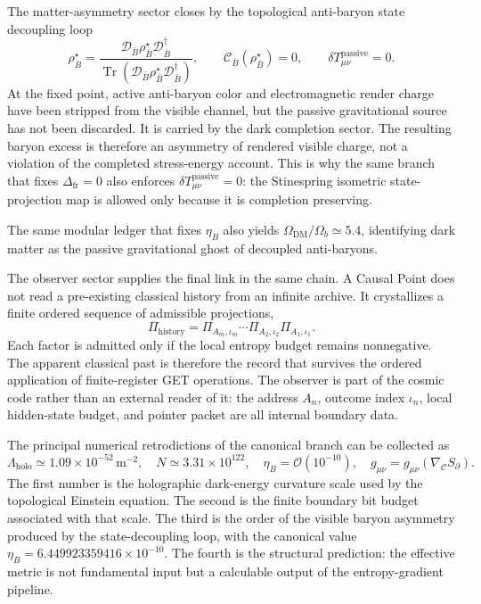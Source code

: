 \documentclass[11pt,letterpaper]{article}
\theoremstyle{plain}
\DeclareMathOperator{\Tr}{Tr}
\newcommand{\Deltafr}{\Delta_{\text{fr}}}
\newcommand{\Lholo}{\Lambda_{\text{holo}}}
\newcommand{\Nbits}{N}
\begin{document}
The matter-asymmetry sector closes by the topological anti-baryon state decoupling loop
\begin{equation}
\label{eq:section-nine-baryogenesis-fixed-point}
 \boxed{
 \rho_{\bar B}^{\star}
 =
 \frac{
 \mathcal D_{\bar B}\rho_{\bar B}^{\star}\mathcal D_{\bar B}^{\dagger}}
 {\Tr\!\left(
 \mathcal D_{\bar B}\rho_{\bar B}^{\star}\mathcal D_{\bar B}^{\dagger}
 \right)},
 \qquad
 \mathcal C_{\bar B}(\rho_{\bar B}^{\star})=0,
 \qquad
 \delta T_{\mu\nu}^{\text{passive}}=0.
 }
\end{equation}
At the fixed point, active anti-baryon color and electromagnetic render charge
have been stripped from the visible channel, but the passive gravitational
source has not been discarded.  It is carried by the dark completion sector.
The resulting baryon excess is therefore an asymmetry of rendered visible
charge, not a violation of the completed stress-energy account.  This is why
the same branch that fixes $\Deltafr=0$ also enforces
\(\delta T_{\mu\nu}^{\text{passive}}=0\): the Stinespring isometric
state-projection map is allowed only because it is completion preserving.

The same modular ledger that fixes \(\eta_B\) also yields
\(\Omega_{\text{DM}}/\Omega_b\simeq5.4\), identifying dark matter as the passive
gravitational ghost of decoupled anti-baryons.

The observer sector supplies the final link in the same chain.  A Causal Point
does not read a pre-existing classical history from an infinite archive.  It
crystallizes a finite ordered sequence of admissible projections,
\begin{equation}
\label{eq:section-nine-history-crystallization}
 \boxed{
 \Pi_{\text{history}}
 =
 \Pi_{A_m,\iota_m}\cdots\Pi_{A_2,\iota_2}\Pi_{A_1,\iota_1}.
 }
\end{equation}
Each factor is admitted only if the local entropy budget remains nonnegative.
The apparent classical past is therefore the record that survives the ordered
application of finite-register GET operations.  The observer is part of the
cosmic code rather than an external reader of it: the address $A_n$, outcome
index $\iota_n$, local hidden-state budget, and pointer packet are all internal
boundary data.

The principal numerical retrodictions of the canonical branch can be collected
as
\begin{equation}
\label{eq:section-nine-prediction-summary}
 \boxed{
 \Lholo\simeq1.09\times10^{-52}\,\mathrm{m}^{-2},
 \quad
 \Nbits\simeq3.31\times10^{122},
 \quad
 \eta_B=\mathcal O(10^{-10}),
 \quad
 g_{\mu\nu}=g_{\mu\nu}\!\left(\nabla_{\mathcal C}S_{\partial}\right).
 }
\end{equation}
The first number is the holographic dark-energy curvature scale used by the
topological Einstein equation.  The second is the finite boundary bit budget
associated with that scale.  The third is the order of the visible baryon
asymmetry produced by the state-decoupling loop, with the canonical value
\(\eta_B=6.449923359416\times10^{-10}\).  The fourth is the structural prediction:
the effective metric is not fundamental input but a calculable output of the
entropy-gradient pipeline.
\end{document}
